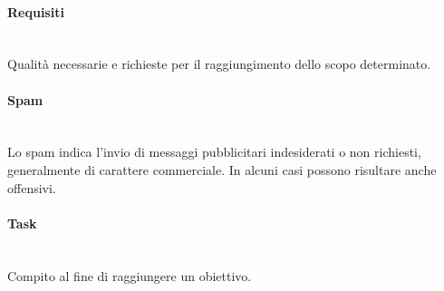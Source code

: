 \paragraph{Requisiti}~\smallskip \\
Qualità necessarie e richieste per il raggiungimento dello scopo determinato.

\paragraph{Spam}~\smallskip \\
Lo spam indica l'invio di messaggi pubblicitari indesiderati o non richiesti, generalmente di carattere commerciale. In alcuni casi possono risultare anche offensivi.

\paragraph{Task}~\smallskip \\
Compito al fine di raggiungere un obiettivo.